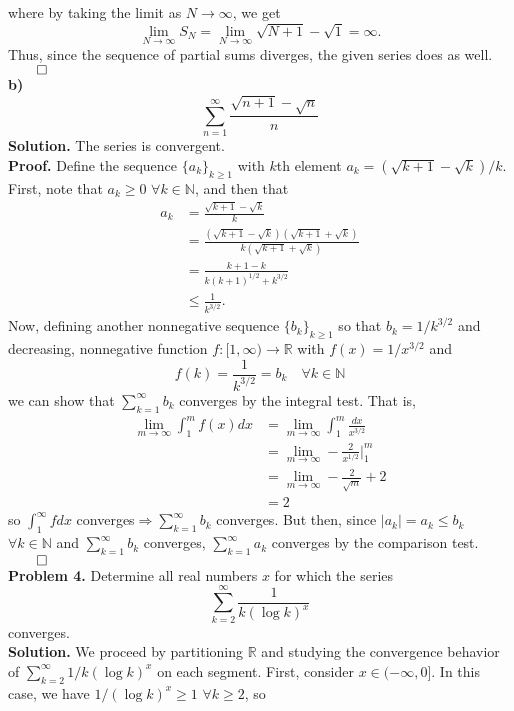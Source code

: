 \documentclass[11pt, letterpaper]{article}
\newcommand{\mbb}[1]{\mathbb{#1}}
\begin{document}
    where by taking the limit as $N\rightarrow\infty$, we get
    \[\lim_{N\rightarrow\infty}S_N=\lim_{N\rightarrow\infty}\sqrt{N+1}-\sqrt{1}=\infty.\]
    Thus, since the sequence of partial sums diverges, the given series does as well.\hfill{$\qed$}\\[10pt]
    {\bf b)}
    \[\sum_{n=1}^\infty\frac{\sqrt{n+1}-\sqrt{n}}{n}\]
    {\bf Solution.} The series is convergent.\\[10pt]
    {\bf Proof.} Define the sequence $\{a_k\}_{k\geq 1}$ with $k$th element $a_k=(\sqrt{k+1}-\sqrt{k})/k$. First, note that $a_k\geq 0$ $\forall k\in \mbb{N}$, and then that
    \begin{align*}
        a_k&=\frac{\sqrt{k+1}-\sqrt{k}}{k}\\
        &=\frac{(\sqrt{k+1}-\sqrt{k})(\sqrt{k+1}+\sqrt{k})}{k(\sqrt{k+1}+\sqrt{k})}\\
        &=\frac{k+1-k}{k(k+1)^{1/2}+k^{3/2}}\\
        &\leq\frac{1}{k^{3/2}}.
    \end{align*}
    Now, defining another nonnegative sequence $\{b_k\}_{k\geq 1}$ so that $b_k=1/k^{3/2}$ and decreasing, nonnegative function $f:[1,\infty)\rightarrow\mbb{R}$ with $f(x)=1/x^{3/2}$ and 
    \[f(k)=\frac{1}{k^{3/2}}=b_k\quad\forall k\in\mbb{N}\]
    we can show that $\sum_{k=1}^\infty b_k$ converges by the integral test. That is,
    \begin{align*}
        \lim_{m\rightarrow\infty}\int_{1}^mf(x)dx&=\lim_{m\rightarrow\infty}\int_1^m\frac{dx}{x^{3/2}}\\
        &=\lim_{m\rightarrow\infty}-\frac{2}{x^{1/2}}\bigg|_{1}^{m}\\
        &=\lim_{m\rightarrow\infty}-\frac{2}{\sqrt{m}}+2\\
        &=2
    \end{align*}
    so $\int_{1}^\infty fdx$ converges$\Rightarrow \sum_{k=1}^\infty b_k$ converges. But then, since $|a_k|=a_k\leq b_k$ $\forall k\in\mbb{N}$ and $\sum_{k=1}^\infty b_k$ converges,
    $\sum_{k=1}^\infty a_k$ converges by the comparison test.\hfill{$\qed$}\\[10pt]
    {\bf Problem 4.} Determine all real numbers $x$ for which the series
    \[\sum_{k=2}^\infty\frac{1}{k(\log k)^x}\tag{1}\]
    converges.\\[10pt]
    {\bf Solution.} We proceed by partitioning $\mbb{R}$ and studying the convergence behavior of $\sum_{k=2}^\infty1/k(\log k)^x$ on each segment. First, consider $x\in(-\infty, 0]$.
    In this case, we have $1/(\log k)^x\geq 1$ $\forall k\geq 2$, so 
\end{document}
